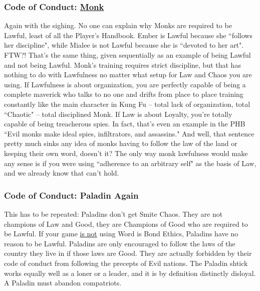 \subsubsection{Code of Conduct: \hyperref[class:monk]{Monk}}
Again with the sighing. No one can explain why Monks are required to be Lawful, least of all the Player's Handbook. Ember is Lawful because she ``follows her discipline", while Mialee is not Lawful because she is ``devoted to her art". FTW?! That's the same thing, given sequentially as an example of being Lawful and not being Lawful. Monk's training requires strict discipline, but that has nothing to do with Lawfulness no matter what setup for Law and Chaos you are using. If Lawfulness is about organization, you are perfectly capable of being a complete maverick who talks to no one and drifts from place to place training constantly like the main character in Kung Fu -- total lack of organization, total ``Chaotic" -- total disciplined Monk. If Law is about Loyalty, you're totally capable of being treacherous spies. In fact, that's even an example in the PHB ``Evil monks make ideal spies, infiltrators, and assassins." And well, that sentence pretty much sinks any idea of monks having to follow the law of the land or keeping their own word, doesn't it? The only way monk lawfulness would make any sense is if you were using ``adherence to an arbitrary self" as the basis of Law, and we already know that can't hold.

\subsubsection{Code of Conduct: Paladin Again}
This has to be repeated: Paladins don't get Smite Chaos. They are not champions of Law and Good, they are Champions of Good who are required to be Lawful. If your game \underline{is not} using Word is Bond Ethics, Paladins have no reason to be Lawful. Paladins are only encouraged to follow the laws of the country they live in if those laws are Good. They are actually forbidden by their code of conduct from following the precepts of Evil nations. The Paladin shtick works equally well as a loner or a leader, and it is by definition distinctly disloyal. A Paladin must abandon compatriots.
